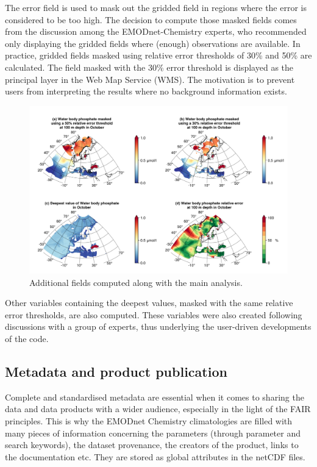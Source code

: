 \documentclass[essd, manuscript]{copernicus}
\begin{document}
The error field is used to mask out the gridded field in regions where the error is considered to be too high. The decision to compute those masked fields comes from the discussion among the EMODnet-Chemistry experts, who recommended only displaying the gridded fields where (enough) observations are available. In practice, gridded fields masked using relative error thresholds of 30\% and 50\% are calculated. The field masked with the 30\% error threshold is displayed as the principal layer in the Web Map Service (WMS). The motivation is to prevent users from interpreting the results where no background information exists. 

\begin{figure}[t]
\includegraphics[width=\textwidth]{Water_body_phosphate_depth-100_month-10_additional_fields.png}
\caption{Additional fields computed along with the main analysis.\label{fig:additionalfields}}
\end{figure}

Other variables containing the deepest values, masked with the same relative error thresholds, are also computed. These variables were also created following discussions with a group of experts, thus underlying the user-driven developments of the code.

\subsection{Metadata and product publication}

Complete and standardised metadata are essential when it comes to sharing the data and data products with a wider audience, especially in the light of the FAIR principles. This is why the EMODnet Chemistry climatologies are filled with many pieces of information concerning the parameters (through parameter and search keywords), the dataset provenance, the creators of the product, links to the documentation etc. They are stored as global attributes in the netCDF files.
\end{document}
